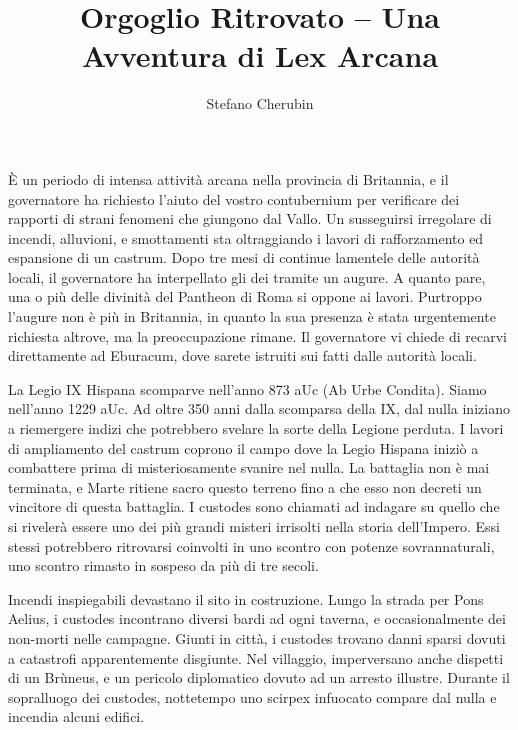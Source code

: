 \documentclass[11.5pt,twocolumn]{article}
\begin{document}
\title{Orgoglio Ritrovato -- Una Avventura di Lex Arcana}

\author{Stefano Cherubin}
\date{}

\maketitle

\`{E} un periodo di intensa attivit\`{a} arcana nella provincia di Britannia, e il governatore ha richiesto l'aiuto del vostro contubernium per verificare dei rapporti di strani fenomeni che giungono dal Vallo.
Un susseguirsi irregolare di incendi, alluvioni, e smottamenti sta oltraggiando i lavori di rafforzamento ed espansione di un castrum.
Dopo tre mesi di continue lamentele delle autorit\`{a} locali, il governatore ha interpellato gli dei tramite un augure.
A quanto pare, una o pi\`{u} delle divinit\`{a} del Pantheon di Roma si oppone ai lavori.
Purtroppo l'augure non \`{e} pi\`{u} in Britannia, in quanto la sua presenza \`{e} stata urgentemente richiesta altrove, ma la preoccupazione rimane.
Il governatore vi chiede di recarvi direttamente ad Eburacum, dove sarete istruiti sui fatti dalle autorit\`{a} locali.

La Legio IX Hispana scomparve nell'anno 873 aUc (Ab Urbe Condita).
Siamo nell'anno 1229 aUc.
Ad oltre 350 anni dalla scomparsa della IX, dal nulla iniziano a riemergere indizi che potrebbero svelare la sorte della Legione perduta.
I lavori di ampliamento del castrum coprono il campo dove la Legio Hispana inizi\`{o} a combattere prima di misteriosamente svanire nel nulla.
La battaglia non \`{e} mai terminata, e Marte ritiene sacro questo terreno fino a che esso non decreti un vincitore di questa battaglia.
I custodes sono chiamati ad indagare su quello che si riveler\`{a} essere uno dei pi\`{u} grandi misteri irrisolti nella storia dell'Impero.
Essi stessi potrebbero ritrovarsi coinvolti in uno scontro con potenze sovrannaturali, uno scontro rimasto in sospeso da pi\`{u} di tre secoli.


%
Incendi inspiegabili devastano il sito in costruzione.
Lungo la strada per Pons Aelius, i custodes incontrano diversi bardi ad ogni taverna, e occasionalmente dei non-morti nelle campagne.
Giunti in citt\`{a}, i custodes trovano danni sparsi dovuti a catastrofi apparentemente disgiunte.
Nel villaggio, imperversano anche dispetti di un Br\`{u}neus, e un pericolo diplomatico dovuto ad un arresto illustre.
Durante il sopralluogo dei custodes, nottetempo uno scirpex infuocato compare dal nulla e incendia alcuni edifici.
\end{document}
